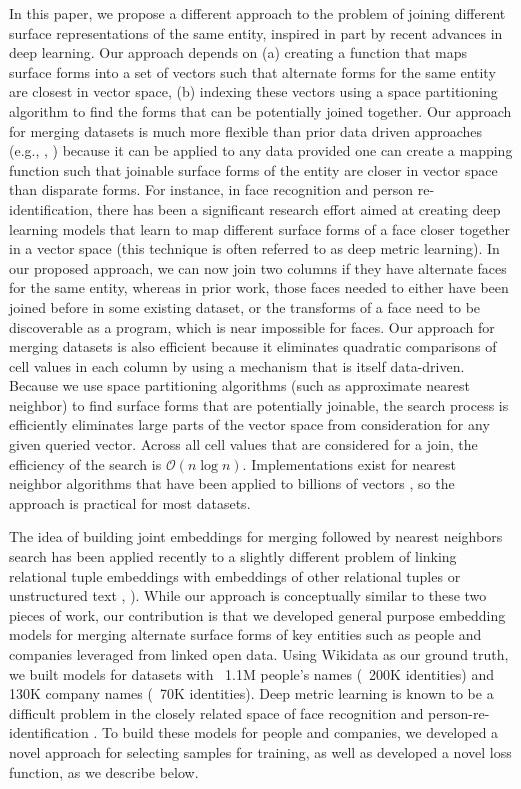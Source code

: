 In this paper, we propose a different approach to the problem of joining different surface representations of the same entity, inspired in part by recent advances in deep learning.  Our approach depends on (a) creating a function that maps surface forms into a set of vectors such that alternate forms for the same entity are closest in vector space, (b) indexing these vectors using a space partitioning algorithm to find the forms that can be potentially joined together.  Our approach for merging datasets is much more flexible than prior data driven approaches (e.g., \cite{He:2015:SJS:2824032.2824036}, \cite{auto-join-joining-tables-leveraging-transformations}) because it can be applied to any data provided one can create a mapping function such that joinable surface forms of the entity are closer in vector space than disparate forms.  For instance, in face recognition and person re-identification, there has been a significant research effort aimed at creating deep learning models that learn to map different surface forms of a face closer together in a vector space (this technique is often referred to as deep metric learning).  In our proposed approach, we can now join two columns if they have alternate faces for the same entity, whereas in prior work, those faces needed to either have been joined before in some existing dataset, or the transforms of a face need to be discoverable as a program, which is near impossible for faces.  Our approach for merging datasets is also efficient because it eliminates quadratic comparisons of cell values in each column by using a mechanism that is itself data-driven.  Because we use space partitioning algorithms (such as approximate nearest neighbor) to find surface forms that are potentially joinable, the search process is efficiently eliminates large parts of the vector space from consideration for any given queried vector.  Across all cell values that are considered for a join, the efficiency of the search is $\mathcal{O}(n\log{}n)$.  Implementations exist for nearest neighbor algorithms that have been applied to billions of vectors \cite{JDH17}, so the approach is practical for most datasets.  

The idea of building joint embeddings for merging followed by nearest neighbors search has been applied recently to a slightly different problem of linking relational tuple embeddings with embeddings of other relational tuples or unstructured text \cite{Bordawekar18}, \cite{IDEL18}).  While our approach is conceptually similar to these two pieces of work, our contribution is that we developed general purpose embedding models for merging alternate surface forms of key entities such as people and companies leveraged from linked open data. Using Wikidata as our ground truth, we built models for datasets with ~1.1M people's names (~200K identities) and 130K company names (~70K identities).  Deep metric learning is known to be a difficult problem in the closely related space of face recognition and person-re-identification \cite{DBLP:conf/cvpr/SchroffKP15}.  To build these models for people and companies, we developed a novel approach for selecting samples for training, as well as developed a novel loss function, as we describe below.

